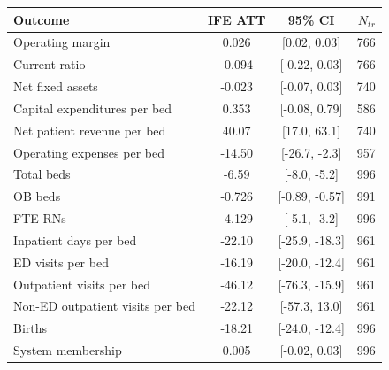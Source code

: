 \begin{tabular}{lccr}
\toprule
Outcome & IFE ATT & 95\% CI & $N_{tr}$ \\
\midrule
Operating margin & 0.026 & [0.02, 0.03] & 766 \\
Current ratio & -0.094 & [-0.22, 0.03] & 766 \\
Net fixed assets & -0.023 & [-0.07, 0.03] & 740 \\
Capital expenditures per bed & 0.353 & [-0.08, 0.79] & 586 \\
Net patient revenue per bed & 40.07 & [17.0, 63.1] & 740 \\
Operating expenses per bed & -14.50 & [-26.7, -2.3] & 957 \\
\addlinespace
Total beds & -6.59 & [-8.0, -5.2] & 996 \\
OB beds & -0.726 & [-0.89, -0.57] & 991 \\
FTE RNs & -4.129 & [-5.1, -3.2] & 996 \\
Inpatient days per bed & -22.10 & [-25.9, -18.3] & 961 \\
\addlinespace
ED visits per bed & -16.19 & [-20.0, -12.4] & 961 \\
Outpatient visits per bed & -46.12 & [-76.3, -15.9] & 961 \\
Non-ED outpatient visits per bed & -22.12 & [-57.3, 13.0] & 961 \\
Births & -18.21 & [-24.0, -12.4] & 996 \\
\addlinespace
System membership & 0.005 & [-0.02, 0.03] & 996 \\
\bottomrule
\end{tabular}
